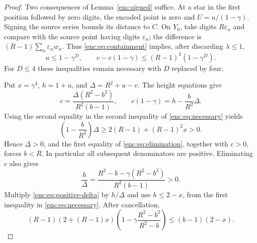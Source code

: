 \documentclass[11pt,letterpaper]{amsart}
\theoremstyle{definition}
\theoremstyle{remark}
\numberwithin{equation}{section}
\begin{document}
\begin{proof}
Two consequences of Lemma~\ref{enc:signed} suffice. At a star in
the first position followed by zero digits, the encoded point is
zero and $U=u/(1-\gamma)$. Signing the source series bounds its
distance to $C$. On $Y_0$, take digits $R\varepsilon_n$ and compare
with the source point having digits $\varepsilon_n$; the difference
is $(R-1)\sum_n\varepsilon_nw_n$. Thus
\eqref{enc:eq:containment} implies, after discarding $\lambda\le1$,
\begin{equation}\label{enc:eq:necessary}
 u\le1-\gamma^D,\qquad
 v-c(1-\gamma)\le(R-1)^2(1-\gamma^D).
\end{equation}
For $D\le4$ these inequalities remain necessary with $D$ replaced
by four.

Put $x=\gamma^4$, $h=1+u$, and $\Delta=R^2+u-v$.
The height equations give
\begin{equation}\label{enc:eq:elimination}
 c=\frac{\Delta(R^2-b^2)}{R^2(b-1)},\qquad
 c(1-\gamma)=h-\frac b{R^2}\Delta.
\end{equation}
Using the second equality in the second inequality of
\eqref{enc:eq:necessary} yields
\begin{equation}\label{enc:eq:positive-delta}
 \left(1-\frac b{R^2}\right)\Delta
 \ge2(R-1)+(R-1)^2x>0.
\end{equation}
Hence $\Delta>0$, and the first equality of
\eqref{enc:eq:elimination}, together with $c>0$, forces $b<R$.
In particular all subsequent denominators are positive.
Eliminating $c$ also gives
\[
 \frac h\Delta
 =\frac{R^2-b-\gamma(R^2-b^2)}{R^2(b-1)}>0.
\]
Multiply \eqref{enc:eq:positive-delta} by $h/\Delta$ and use
$h\le2-x$, from the first inequality in
\eqref{enc:eq:necessary}. After cancellation,
\begin{equation}\label{enc:eq:reduced}
 (R-1)(2+(R-1)x)
 \left(1-\gamma\frac{R^2-b^2}{R^2-b}\right)
 \le(b-1)(2-x).
\end{equation}


\end{proof}
\end{document}
